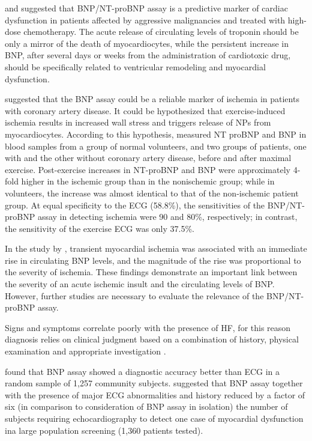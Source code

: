\documentclass[14pt,a4paper,onecolumn]{extarticle}
\begin{document}
\citep{bib3161} and \citep{bib3162} suggested that BNP/NT-proBNP assay is a predictive marker of cardiac dysfunction in patients affected by aggressive malignancies and treated with high-dose chemotherapy. The acute release of circulating levels of troponin should be only a mirror of the death of myocardiocytes, while the persistent increase in BNP, after several days or weeks from the administration of cardiotoxic drug, should be specifically related to ventricular remodeling and myocardial dysfunction.

 \citep{bib3163} \citep{bib3164} suggested that the BNP assay could be a reliable marker of ischemia in patients with coronary artery disease. It could be hypothesized that exercise-induced ischemia results in increased wall stress and triggers release of NPs from myocardiocytes. According to this hypothesis, \citep{bib3163} measured NT proBNP and BNP in blood samples from a group of normal volunteers, and two groups of patients, one with and the other without coronary artery disease, before and after maximal exercise. Post-exercise increases in NT-proBNP and BNP were approximately 4-fold higher in the ischemic group than in the nonischemic group; while in volunteers, the increase was almost identical to that of the non-ischemic patient group. At equal specificity to the ECG (58.8\%), the sensitivities of the BNP/NT-proBNP assay in detecting ischemia were 90 and 80\%, respectively; in contrast, the sensitivity of the exercise ECG was only 37.5\%.

In the study by \citep{bib3164}, transient myocardial ischemia was associated with an immediate rise in circulating BNP levels, and the magnitude of the rise was proportional to the severity of ischemia. These findings demonstrate an important link between the severity of an acute ischemic insult and the circulating levels of BNP. However, further studies are necessary to evaluate the relevance of the BNP/NT-proBNP assay.

Signs and symptoms correlate poorly with the presence of HF, for this reason diagnosis relies on clinical judgment based on a combination of history, physical examination and appropriate investigation \citep{bib365} \citep{bib369} \citep{bib370} \citep{bib3168}.

\citep{bib392} found that BNP assay showed a diagnostic accuracy better than ECG in a random sample of 1,257 community subjects.  \citep{bib3171} suggested that BNP assay together with the presence of major ECG abnormalities and history reduced by a factor of six (in comparison to consideration of BNP assay in isolation) the number of subjects requiring echocardiography to detect one case of myocardial dysfunction ina large population screening (1,360 patients tested).
\end{document}
